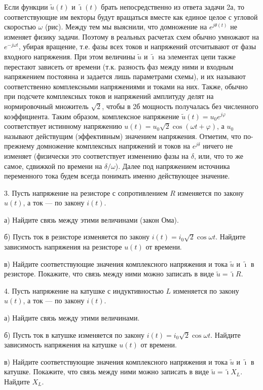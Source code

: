 \documentclass[14pt]{article}
\begin{document}
Если функции $\tilde{u}(t)$ и $\tilde{\imath}(t)$ брать непосредственно из ответа задачи 2а, то соответствующие им векторы будут вращаться вместе как единое целое с угловой скоростью $\omega$ (рис). Между тем мы выяснили, что домножение на $e^{j\theta(t)}$ не изменяет физику задачи. Поэтому в реальных расчетах схем обычно умножают на $e^{-j\omega t}$, убирая вращение, т.е. фазы всех токов и напряжений отсчитывают от фазы входного напряжения. При этом величины $\tilde{u}$ и $\tilde{\imath}$ на элементах цепи также перестают зависеть от времени (т.к. разность фаз между ними и входным напряжением постоянна и задается лишь параметрами схемы), и их называют соответственно комплексными напряжениями и токами на них. Также, обычно при подсчете комплексных токов и напряжений амплитуду делят на нормировочный множитель $\sqrt2$, чтобы в 2б мощность получалась без численного коэффициента. Таким образом, комплексное напряжение $\tilde{u}(t)=u_0 e^{j\varphi}$ соответствует истинному напряжению $u(t)=u_0\sqrt2 \cos(\omega t+\varphi)$, а $u_0$ называют действущим (эффективным) значением напряжения. Отметим, что по-прежнему домножение комплексных напряжений и токов на $e^{j\delta}$ ничего не изменяет (физически это соответствует изменению фазы на $\delta$, или, что то же самое, сдвижкой по времени на $\delta/\omega$). Далее под напряжением источника переменного тока будем всегда понимать именно действующее значение.

3. Пусть напряжение на резисторе с сопротивлением $R$ изменяется по закону $u(t)$, а ток --- по закону $i(t)$.

а) Найдите связь между этими величинами (закон Ома).

б) Пусть ток в резисторе изменяется по закону $i(t)=i_0\sqrt2 \cos\omega t$. Найдите зависимость напряжения на резисторе $u(t)$ от времени.

в) Найдите соответствующие значения комплексного напряжения и тока $\tilde{u}$ и $\tilde{\imath}$ в резисторе. Покажите, что связь между ними можно записать в виде $\tilde{u}=\tilde{\imath}R$.

4. Пусть напряжение на катушке с индуктивностью $L$ изменяется по закону $u(t)$, а ток --- по закону $i(t)$.

а) Найдите связь между этими величинами.

б) Пусть ток в катушке изменяется по закону $i(t)=i_0\sqrt2 \cos\omega t$. Найдите зависимость напряжения на катушке $u(t)$ от времени.

в) Найдите соответствующие значения комплексного напряжения и тока $\tilde{u}$ и $\tilde{\imath}$ в катушке. Покажите, что связь между ними можно записать в виде $\tilde{u}=\tilde{\imath}X_L$. Найдите $X_L$.
\end{document}
